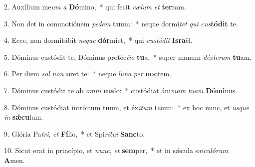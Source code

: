 2. Auxílium me\textit{um} \textit{a} \textbf{Dó}mino,~*  qui fecit \textit{cæ}\textit{lum} \textit{et} \textbf{ter}ram.\

3. Non det in commotiónem \textit{pe}\textit{dem} \textbf{tu}um:~*  neque dormí\textit{tet} \textit{qui} \textit{cus}\textbf{tó}\textbf{dit} te.\

4. Ecce, non dormitábit \textit{ne}\textit{que} \textbf{dór}miet,~*  qui \textit{cus}\textit{tó}\textit{dit} \textbf{Is}\textbf{ra}ël.\

5. Dóminus custódit te, Dóminus protéc\textit{ti}\textit{o} \textbf{tu}a,~*  super manum \textit{déx}\textit{te}\textit{ram} \textbf{tu}am.\

6. Per diem \textit{sol} \textit{non} \textbf{u}ret te:~*  neque \textit{lu}\textit{na} \textit{per} \textbf{noc}tem.\

7. Dóminus custódit te ab \textit{om}\textit{ni} \textbf{ma}lo:~*  custódiat áni\textit{mam} \textit{tu}\textit{am} \textbf{Dó}\textbf{mi}nus.\

8. Dóminus custódiat intróitum tuum, et éx\textit{i}\textit{tum} \textbf{tu}um:~*  ex hoc nunc, et \textit{us}\textit{que} \textit{in} \textbf{sǽ}\textbf{cu}lum.\

9. Glória Pa\textit{tri}, \textit{et} \textbf{Fí}lio,~*  et Spi\textit{rí}\textit{tu}\textit{i} \textbf{Sanc}to.\

10. Sicut erat in princípio, et \textit{nunc}, \textit{et} \textbf{sem}per,~*  et in sǽcula sæ\textit{cu}\textit{ló}\textit{rum}. \textbf{A}men.\

